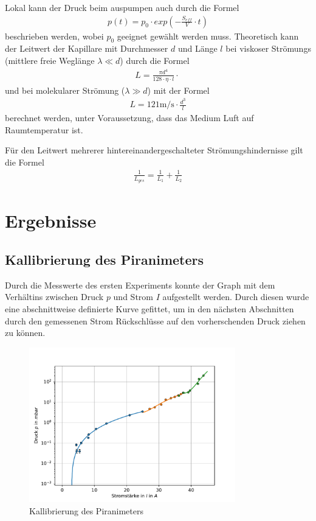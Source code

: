 \documentclass[11pt, a4paper]{article}
\begin{document}
    Lokal kann der Druck beim auspumpen auch durch die Formel
    \begin{align}
        p\left(t\right) = p_0 \cdot exp\left(- \frac{S_{eff}}{V} \cdot t\right)
    \end{align}
    beschrieben werden, wobei $p_0$ geeignet gewählt werden muss.
    Theoretisch kann der Leitwert der Kapillare mit Durchmesser $d$ und Länge $l$ bei viskoser Strömungs (mittlere freie Weglänge $\lambda \ll d$) durch die Formel
    \begin{align}
        L = \frac{\pi d^4}{128 \cdot \eta \cdot l} \cdot \frac{}{}
    \end{align}
    und bei molekularer Strömung ($\lambda \gg d$) mit der Formel
    \begin{align}
        L = 121 \si{\meter\per\second} \cdot \frac{d^3}{l}
    \end{align}
    berechnet werden, unter Voraussetzung, dass das Medium Luft auf Raumtemperatur ist.

    Für den Leitwert mehrerer hintereinandergeschalteter Strömungshindernisse gilt die Formel
    \begin{align}
        \frac{1}{L_{ges}} = \frac{1}{L_1} + \frac{1}{L_2}
    \end{align}






    \section{Ergebnisse}
    \subsection{Kallibrierung des Piranimeters}
    Durch die Messwerte des ersten Experiments konnte der Graph mit dem Verhältins zwischen Druck $p$ und Strom $I$ aufgestellt werden. Durch diesen wurde eine abschnittweise definierte Kurve gefittet, um in den nächsten Abschnitten durch den gemessenen Strom Rückschlüsse auf den vorherschenden Druck ziehen zu können.
    \begin{figure}[h]
        \centering
        \includegraphics[width=0.8\textwidth]{Kallibrierung.pdf}
        \caption{Kallibrierung des Piranimeters}
        \label{fig:piranim}
    \end{figure}
\end{document}
